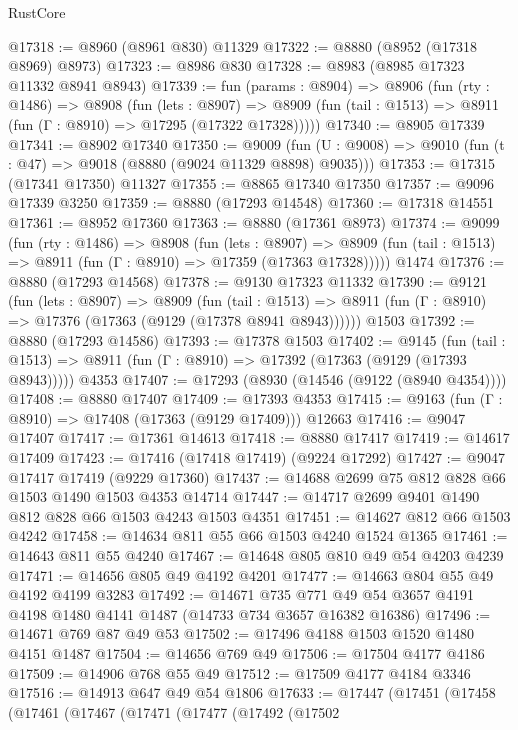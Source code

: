 \begin{lexlean}{RustCore}
\begin{coremodule}
@17318 := @8960 (@8961 @830) @11329
@17322 := @8880 (@8952 (@17318 @8969) @8973)
@17323 := @8986 @830
@17328 := @8983 (@8985 @17323 @11332 @8941 @8943)
@17339 := fun (params : @8904) =>
  @8906
    (fun (rty : @1486) =>
    @8908
      (fun (lets : @8907) =>
      @8909 (fun (tail : @1513) => @8911 (fun (Γ : @8910) => @17295 (@17322 @17328)))))
@17340 := @8905 @17339
@17341 := @8902 @17340
@17350 := @9009
    (fun (U : @9008) => @9010 (fun (t : @47) => @9018 (@8880 (@9024 @11329 @8898) @9035)))
@17353 := @17315 (@17341 @17350) @11327
@17355 := @8865 @17340 @17350
@17357 := @9096 @17339 @3250
@17359 := @8880 (@17293 @14548)
@17360 := @17318 @14551
@17361 := @8952 @17360
@17363 := @8880 (@17361 @8973)
@17374 := @9099
    (fun (rty : @1486) =>
    @8908
      (fun (lets : @8907) =>
      @8909 (fun (tail : @1513) => @8911 (fun (Γ : @8910) => @17359 (@17363 @17328)))))
    @1474
@17376 := @8880 (@17293 @14568)
@17378 := @9130 @17323 @11332
@17390 := @9121
    (fun (lets : @8907) =>
    @8909
      (fun (tail : @1513) =>
      @8911 (fun (Γ : @8910) => @17376 (@17363 (@9129 (@17378 @8941 @8943))))))
    @1503
@17392 := @8880 (@17293 @14586)
@17393 := @17378 @1503
@17402 := @9145
    (fun (tail : @1513) => @8911 (fun (Γ : @8910) => @17392 (@17363 (@9129 (@17393 @8943)))))
    @4353
@17407 := @17293 (@8930 (@14546 (@9122 (@8940 @4354))))
@17408 := @8880 @17407
@17409 := @17393 @4353
@17415 := @9163 (fun (Γ : @8910) => @17408 (@17363 (@9129 @17409))) @12663
@17416 := @9047 @17407
@17417 := @17361 @14613
@17418 := @8880 @17417
@17419 := @14617 @17409
@17423 := @17416 (@17418 @17419) (@9224 @17292)
@17427 := @9047 @17417 @17419 (@9229 @17360)
@17437 := @14688 @2699 @75 @812 @828 @66 @1503 @1490 @1503 @4353 @14714
@17447 := @14717 @2699 @9401 @1490 @812 @828 @66 @1503 @4243 @1503 @4351
@17451 := @14627 @812 @66 @1503 @4242
@17458 := @14634 @811 @55 @66 @1503 @4240 @1524 @1365
@17461 := @14643 @811 @55 @4240
@17467 := @14648 @805 @810 @49 @54 @4203 @4239
@17471 := @14656 @805 @49 @4192 @4201
@17477 := @14663 @804 @55 @49 @4192 @4199 @3283
@17492 := @14671
    @735
    @771
    @49
    @54
    @3657
    @4191
    @4198
    @1480
    @4141
    @1487
    (@14733 @734 @3657 @16382 @16386)
@17496 := @14671 @769 @87 @49 @53
@17502 := @17496 @4188 @1503 @1520 @1480 @4151 @1487
@17504 := @14656 @769 @49
@17506 := @17504 @4177 @4186
@17509 := @14906 @768 @55 @49
@17512 := @17509 @4177 @4184 @3346
@17516 := @14913 @647 @49 @54 @1806
@17633 := @17447
    (@17451
      (@17458
        (@17461
          (@17467
            (@17471
              (@17477
                (@17492
                  (@17502

\end{coremodule}
\end{lexlean}
